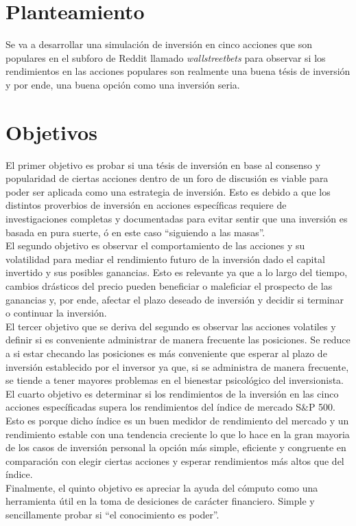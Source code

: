 \documentclass[letterpaper, 12pt]{article}
\begin{document}
\begin{justify}
        \section*{Planteamiento}        
        \justify
        Se va a desarrollar una simulación de inversión en cinco acciones que son populares en el subforo de Reddit llamado \emph{wallstreetbets} para observar si los rendimientos en las acciones
        populares son realmente una buena tésis de inversión y por ende, una buena opción como una inversión seria.
        \section*{Objetivos}
        \justify
        El primer objetivo es probar si una tésis de inversión en base al consenso y popularidad de ciertas acciones dentro de un foro de discusión es viable para poder ser aplicada como una estrategia de inversión. Esto 
        es debido a que los distintos proverbios de inversión en acciones específicas requiere de investigaciones completas y documentadas para evitar sentir que una inversión es basada en pura suerte, ó en este caso
        ``siguiendo a las masas''.
        \\\newline
        El segundo objetivo es observar el comportamiento de las acciones y su volatilidad para mediar el rendimiento futuro de la inversión dado el capital invertido y sus posibles ganancias. Esto es relevante ya que
        a lo largo del tiempo, cambios drásticos del precio pueden beneficiar o maleficiar el prospecto de las ganancias y, por ende, afectar el plazo deseado de inversión y decidir si terminar o continuar la inversión.
        \\\newline
        El tercer objetivo que se deriva del segundo es observar las acciones volatiles y definir si es conveniente administrar de manera frecuente las posiciones. Se reduce a si estar checando las posiciones es más conveniente que esperar
        al plazo de inversión establecido por el inversor ya que, si se administra de manera frecuente, se tiende a tener mayores problemas en el bienestar psicológico del inversionista.
        \\\newline
        El cuarto objetivo es determinar si los rendimientos de la inversión en las cinco acciones específicadas supera los rendimientos del índice de mercado S\&P 500. Esto es porque dicho índice es un buen medidor de rendimiento del mercado
        y un rendimiento estable con una tendencia creciente lo que lo hace en la gran mayoria de los casos de inversión personal la opción más simple, eficiente y congruente en comparación con elegir ciertas acciones y esperar rendimientos más
        altos que del índice.
        \\\newline
        Finalmente, el quinto objetivo es apreciar la ayuda del cómputo como una herramienta útil en la toma de desiciones de carácter financiero. Simple y sencillamente probar si ``el conocimiento es poder''. 

\end{justify}
\end{document}
